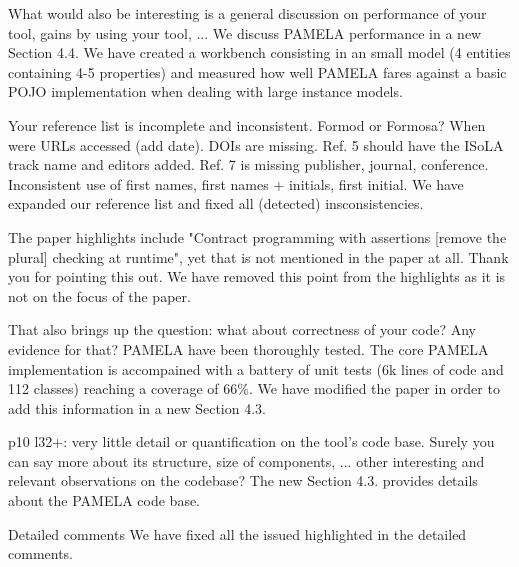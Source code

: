 \documentclass[10pt]{article}
\begin{document}
\begin{response}{What would also be interesting is a general discussion on performance of your tool, gains by using your tool, ...
} We discuss PAMELA performance in a new Section 4.4. We have created a workbench consisting in an small model (4 entities containing 4-5 properties) and measured how well PAMELA fares against a basic POJO implementation when dealing with large instance models.
\end{response}

\begin{response}{Your reference list is incomplete and inconsistent. Formod or Formosa? When were URLs accessed (add date). DOIs are missing. Ref. 5 should have the ISoLA track name and editors added. Ref. 7 is missing publisher, journal, conference. Inconsistent use of first names, first names + initials, first initial.}
We have expanded our reference list and fixed all (detected) insconsistencies.
\end{response}

\begin{response}{The paper highlights include "Contract programming with assertions [remove the plural] checking at runtime", yet that is not mentioned in the paper at all.
} Thank you for pointing this out. We have removed this point from the highlights as it is not on the focus of the paper.
\end{response}

\begin{response}{That also brings up the question: what about correctness of your code? Any evidence for that?}
PAMELA have been thoroughly tested. The core PAMELA implementation is accompained with a battery of unit tests (6k lines of code and 112 classes) reaching a coverage of 66\%. We have modified the paper in order to add this information in a new Section 4.3.
\end{response}

\begin{response}{p10 l32+: very little detail or quantification on the tool's code base. Surely you can say more about its structure, size of components, ... other interesting and relevant observations on the codebase?}
The new Section 4.3. provides details about the PAMELA code base.
\end{response}

\begin{response}{Detailed comments}
We have fixed all the issued highlighted in the detailed comments.
\end{response}
\end{document}
